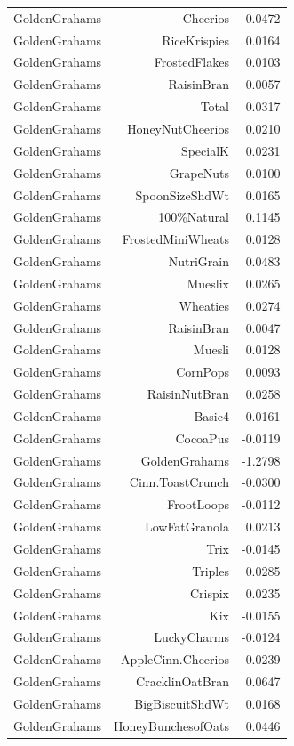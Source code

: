 \begin{longtable}{@{}lrr@{}}
GoldenGrahams & Cheerios & 0.0472 \\
GoldenGrahams & RiceKrispies & 0.0164 \\
GoldenGrahams & FrostedFlakes & 0.0103 \\
GoldenGrahams & RaisinBran & 0.0057 \\
GoldenGrahams & Total & 0.0317 \\
GoldenGrahams & HoneyNutCheerios & 0.0210 \\
GoldenGrahams & SpecialK & 0.0231 \\
GoldenGrahams & GrapeNuts & 0.0100 \\
GoldenGrahams & SpoonSizeShdWt & 0.0165 \\
GoldenGrahams & 100\%Natural & 0.1145 \\
GoldenGrahams & FrostedMiniWheats & 0.0128 \\
GoldenGrahams & NutriGrain & 0.0483 \\
GoldenGrahams & Mueslix & 0.0265 \\
GoldenGrahams & Wheaties & 0.0274 \\
GoldenGrahams & RaisinBran & 0.0047 \\
GoldenGrahams & Muesli & 0.0128 \\
GoldenGrahams & CornPops & 0.0093 \\
GoldenGrahams & RaisinNutBran & 0.0258 \\
GoldenGrahams & Basic4 & 0.0161 \\
GoldenGrahams & CocoaPus & -0.0119 \\
GoldenGrahams & GoldenGrahams & -1.2798 \\
GoldenGrahams & Cinn.ToastCrunch & -0.0300 \\
GoldenGrahams & FrootLoops & -0.0112 \\
GoldenGrahams & LowFatGranola & 0.0213 \\
GoldenGrahams & Trix & -0.0145 \\
GoldenGrahams & Triples & 0.0285 \\
GoldenGrahams & Crispix & 0.0235 \\
GoldenGrahams & Kix & -0.0155 \\
GoldenGrahams & LuckyCharms & -0.0124 \\
GoldenGrahams & AppleCinn.Cheerios & 0.0239 \\
GoldenGrahams & CracklinOatBran & 0.0647 \\
GoldenGrahams & BigBiscuitShdWt & 0.0168 \\
GoldenGrahams & HoneyBunchesofOats & 0.0446 \\

\end{longtable}
